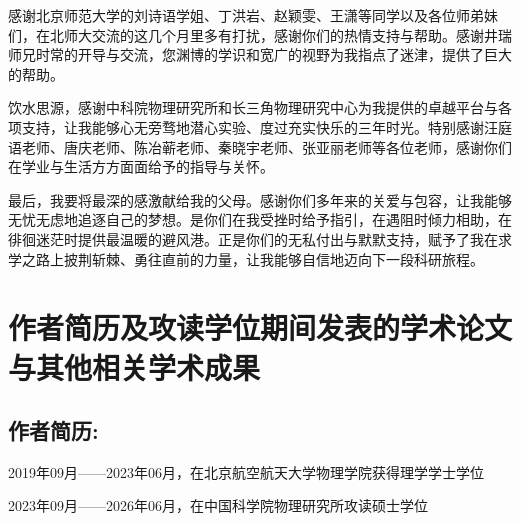 感谢北京师范大学的刘诗语学姐、丁洪岩、赵颖雯、王潇等同学以及各位师弟妹们，在北师大交流的这几个月里多有打扰，感谢你们的热情支持与帮助。感谢井瑞师兄时常的开导与交流，您渊博的学识和宽广的视野为我指点了迷津，提供了巨大的帮助。

饮水思源，感谢中科院物理研究所和长三角物理研究中心为我提供的卓越平台与各项支持，让我能够心无旁骛地潜心实验、度过充实快乐的三年时光。特别感谢汪庭语老师、唐庆老师、陈冶蕲老师、秦晓宇老师、张亚丽老师等各位老师，感谢你们在学业与生活方方面面给予的指导与关怀。

最后，我要将最深的感激献给我的父母。感谢你们多年来的关爱与包容，让我能够无忧无虑地追逐自己的梦想。是你们在我受挫时给予指引，在遇阻时倾力相助，在徘徊迷茫时提供最温暖的避风港。正是你们的无私付出与默默支持，赋予了我在求学之路上披荆斩棘、勇往直前的力量，让我能够自信地迈向下一段科研旅程。




\chapter{作者简历及攻读学位期间发表的学术论文与其他相关学术成果}

\section*{作者简历:}
2019年09月——2023年06月，在北京航空航天大学物理学院获得理学学士学位

2023年09月——2026年06月，在中国科学院物理研究所攻读硕士学位


